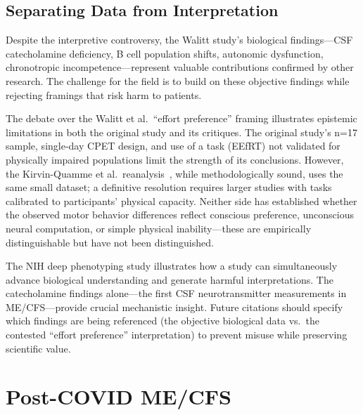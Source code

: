 \subsection{Separating Data from Interpretation}

Despite the interpretive controversy, the Walitt study's biological findings---CSF catecholamine deficiency, B cell population shifts, autonomic dysfunction, chronotropic incompetence---represent valuable contributions confirmed by other research. The challenge for the field is to build on these objective findings while rejecting framings that risk harm to patients.

\begin{limitation}
The debate over the Walitt et al.\ ``effort preference'' framing illustrates epistemic limitations in both the original study and its critiques. The original study's n=17 sample, single-day CPET design, and use of a task (EEfRT) not validated for physically impaired populations limit the strength of its conclusions. However, the Kirvin-Quamme et al.\ reanalysis~\cite{kirvinquamme2025effort}, while methodologically sound, uses the same small dataset; a definitive resolution requires larger studies with tasks calibrated to participants' physical capacity. Neither side has established whether the observed motor behavior differences reflect conscious preference, unconscious neural computation, or simple physical inability---these are empirically distinguishable but have not been distinguished.
\end{limitation}

\begin{observation}
The NIH deep phenotyping study illustrates how a study can simultaneously advance biological understanding and generate harmful interpretations. The catecholamine findings alone---the first CSF neurotransmitter measurements in ME/CFS---provide crucial mechanistic insight. Future citations should specify which findings are being referenced (the objective biological data vs.\ the contested ``effort preference'' interpretation) to prevent misuse while preserving scientific value.
\end{observation}

\section{Post-COVID ME/CFS}
\label{sec:post-covid-debates}

